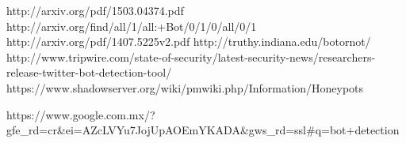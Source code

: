 \documentclass[twoside]{article}
\begin{document}
\begin{multicols}{2}
http://arxiv.org/pdf/1503.04374.pdf
http://arxiv.org/find/all/1/all:+Bot/0/1/0/all/0/1
http://arxiv.org/pdf/1407.5225v2.pdf
http://truthy.indiana.edu/botornot/
http://www.tripwire.com/state-of-security/latest-security-news/researchers-release-twitter-bot-detection-tool/
https://www.shadowserver.org/wiki/pmwiki.php/Information/Honeypots

https://www.google.com.mx/?gfe_rd=cr&ei=AZcLVYu7JojUpAOEmYKADA&gws_rd=ssl#q=bot+detection





\end{multicols}
\end{document}
